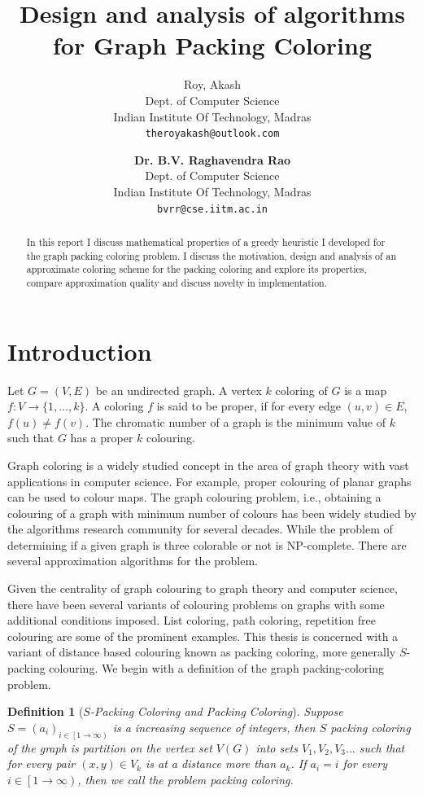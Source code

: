 \documentclass{article}
\title{Design and analysis of algorithms for Graph Packing Coloring}
\author{
  Roy, Akash \\Dept. of Computer Science\\Indian Institute Of Technology, Madras\\\texttt{theroyakash@outlook.com} \and \textbf{Dr. B.V. Raghavendra Rao}\\Dept. of Computer Science\\Indian Institute Of Technology, Madras\\\texttt{bvrr@cse.iitm.ac.in}
}
\newtheorem{definition}{Definition}[section]
\theoremstyle{remark}
\begin{document}
\maketitle

\begin{abstract}
In this report I discuss mathematical properties of a greedy heuristic I developed for the graph packing coloring problem. I discuss the motivation, design and analysis of an approximate coloring scheme for the packing coloring and explore its properties, compare approximation quality and discuss novelty in implementation.
\end{abstract}




\section{Introduction}
 Let $G= (V,E)$ be an undirected graph. A vertex $k$ coloring of $G$ is a map $f: V \to \{1,\ldots, k\}$. A coloring $f$ is said to be proper, if for every edge $(u,v)\in E$, $f(u) \neq f(v)$. The chromatic number of a graph is the minimum value of $k$ such that $G$ has a proper $k$ colouring. 

Graph coloring is a widely studied concept in the area of graph theory with vast applications in computer science. For example,  proper colouring of planar graphs can be used to colour maps.  The graph colouring problem, i.e., obtaining a colouring of a graph with minimum number of colours has been widely studied by the algorithms research community for several decades.  While  the problem of determining if a given graph is three colorable or not is $\mathrm{NP}$-complete. There are several approximation algorithms for the problem.  

Given the centrality of graph colouring to graph theory and computer science, there have been several variants of colouring problems on graphs with some additional conditions imposed.  List coloring, path coloring, repetition free colouring are some of the prominent examples.  This thesis is concerned with a variant of distance based colouring known as packing coloring, more generally $S$-packing colouring. We  begin with a definition of the  graph packing-coloring problem.

\begin{definition}[\textit{$S$-Packing Coloring and Packing Coloring}]
    \textit{Suppose $S = (a_i)_{i \in \left[1 \to \infty\right)}$ is a increasing sequence of integers,
    then $S$ packing coloring of the graph is partition on the vertex set
    $V(G)$ into sets $V_1, V_2, V_3 \dots$ such that for every pair $(x, y) \in V_k$
    is at a distance more than $a_k$. If $a_i = i$ for every 
    $i \in \left[1 \to \infty\right)$, then we call the problem packing coloring.}
\end{definition}
\end{document}
